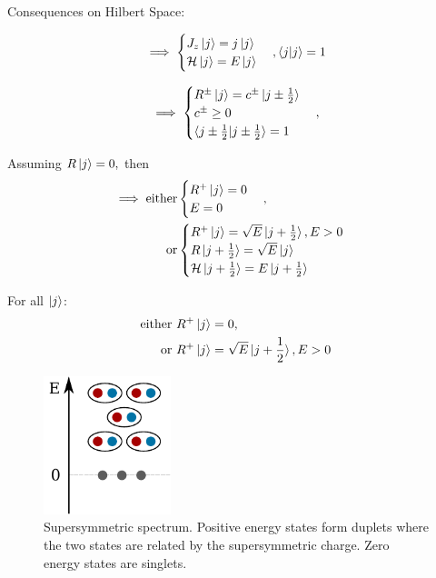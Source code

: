\documentclass[a4paper]{article}
\newcommand{\Ha}[0]{\mathcal{H}}
\begin{document}
Consequences on Hilbert Space:

\begin{equation}
	\implies
	\begin{cases}
		J_z \ket{j} = j \ket{j}\\
		\Ha \ket{j} = E \ket{j}\\
	\end{cases}, \braket{j|j} = 1
\end{equation}

\begin{equation}
	\implies
	\begin{cases}
		R^{\pm} \ket{j} = c^{\pm} \ket{j \pm \frac{1}{2}} \\
		c^{\pm} \geq 0 \\
		\braket{j\pm \frac{1}{2}|j\pm \frac{1}{2}} = 1
	\end{cases},
\end{equation}

Assuming
$
R\ket{j} = 0,
$
then
\begin{align}
	\implies \text{either}
	&\begin{cases}
		R^{+} \ket{j} = 0\\
		E = 0
	\end{cases},\\
	\text{or}
	&\begin{cases}
		R^{+} \ket{j} = \sqrt{E} \ket{j + \frac{1}{2}}, E>0\\
		R \ket{j + \frac{1}{2}} = \sqrt{E} \ket{j}\\
		\Ha \ket{j + \frac{1}{2}} = E \ket{j + \frac{1}{2}}\\
	\end{cases}
\end{align}

For all $\ket{j}$:
\begin{align}
	\text{either } &R^{+} \ket{j} = 0,\\
	\text{or }     &R^{+} \ket{j} = \sqrt{E} \ket{j + \frac{1}{2}}, E>0
\end{align}

\begin{figure}
	\includegraphics[width=0.33\textwidth]{Figures/Supersymmetric_spectrum.pdf}
	\caption{Supersymmetric spectrum. Positive energy states form duplets where the two states are related by the supersymmetric charge. Zero energy states are singlets. }
	\label{fig:Supersymmetric_spectrum}
\end{figure}
\end{document}
